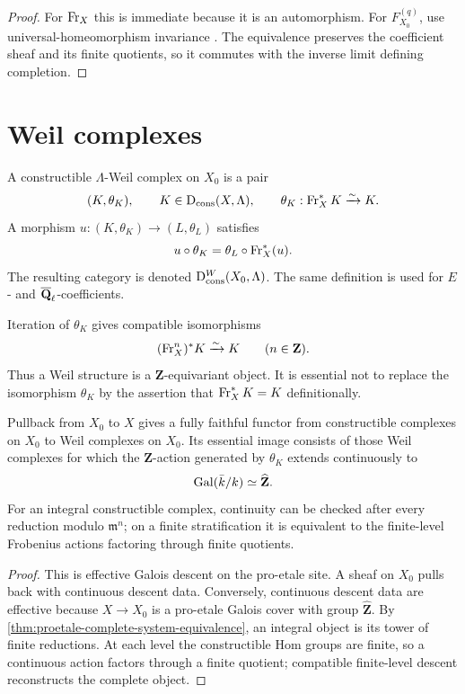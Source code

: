 \begin{proof}
For \(\operatorname{Fr}_X\) this is immediate because it is an automorphism.  For
\(F^{(q)}_{X_0}\), use universal-homeomorphism invariance
\cite[Lemma~5.4.2]{BhattScholzeProEtale}.  The equivalence preserves the
coefficient sheaf and its finite quotients, so it commutes with the inverse
limit defining completion.
\end{proof}

\section{Weil complexes}

\begin{definition}
\label{def:proetale-weil-complex}
A constructible \(\Lambda\)-Weil complex on \(X_0\) is a pair
\[
  (K,\theta_K),\qquad
  K\in\mathrm D_{\mathrm{cons}}(X,\Lambda),\qquad
  \theta_K:\operatorname{Fr}_X^*K\xrightarrow{\sim}K.
\]
A morphism \(u:(K,\theta_K)\to(L,\theta_L)\) satisfies
\[
  u\circ\theta_K
   =\theta_L\circ\operatorname{Fr}_X^*(u).
\]
The resulting category is denoted
\(\mathrm D_{\mathrm{cons}}^W(X_0,\Lambda)\).  The same definition is used for
\(E\)- and \(\overline{\mathbf Q}_\ell\)-coefficients.
\end{definition}

Iteration of \(\theta_K\) gives compatible isomorphisms
\[
  (\operatorname{Fr}_X^n)^*K\xrightarrow{\sim}K
  \qquad(n\in\mathbf Z).
\]
Thus a Weil structure is a \(\mathbf Z\)-equivariant object.  It is essential
not to replace the isomorphism \(\theta_K\) by the assertion that
\(\operatorname{Fr}_X^*K=K\) definitionally.

\begin{proposition}
\label{prop:weil-descent-continuity}
Pullback from \(X_0\) to \(X\) gives a fully faithful functor from
constructible complexes on \(X_0\) to Weil complexes on \(X_0\).  Its
essential image consists of those Weil complexes for which the
\(\mathbf Z\)-action generated by \(\theta_K\) extends continuously to
\[
  \operatorname{Gal}(\bar k/k)\simeq\widehat{\mathbf Z}.
\]
For an integral constructible complex, continuity can be checked after every
reduction modulo \(\mathfrak m^n\); on a finite stratification it is
equivalent to the finite-level Frobenius actions factoring through finite
quotients.
\end{proposition}

\begin{proof}
This is effective Galois descent on the pro-etale site.  A sheaf on \(X_0\)
pulls back with continuous descent data.  Conversely, continuous descent
data are effective because \(X\to X_0\) is a pro-etale Galois cover with
group \(\widehat{\mathbf Z}\).  By
\cref{thm:proetale-complete-system-equivalence}, an integral object is its
tower of finite reductions.  At each level the constructible Hom groups are
finite, so a continuous action factors through a finite quotient; compatible
finite-level descent reconstructs the complete object.
\end{proof}

